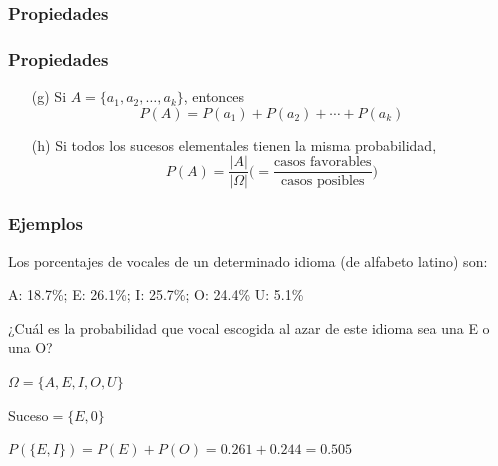 \documentclass[handout]{beamer}\usepackage[]{graphicx}\usepackage[]{color}
\theoremstyle{plain}
\theoremstyle{definition}
\begin{document}
\begin{frame}
\frametitle{Propiedades}
\begin{enumerate}[(a)]
\end{enumerate}
\end{frame}
\begin{frame}
\frametitle{Propiedades}
\begin{enumerate}[(a)]
\item[(g)] Si $A=\{a_1,a_2,\ldots,a_k\}$, entonces
$$
P(A)=P(a_1)+P(a_2)+\cdots+P(a_k)
$$

\item[(h)] Si todos los sucesos elementales tienen la misma probabilidad,
$$
P(A)=\frac{|A|}{|\Omega|}\Big(=\frac{\mbox{casos favorables}}{\mbox{casos posibles}}\Big)
$$
\end{enumerate}
\end{frame}


\begin{frame}
\frametitle{Ejemplos}

Los porcentajes de vocales de un determinado idioma (de alfabeto latino) son:

\begin{center}
A: 18.7\%; E: 26.1\%; I: 25.7\%; O: 24.4\% U: 5.1\%
\end{center}

¿Cuál es la probabilidad que vocal escogida al azar de este idioma sea una E o una O?
\medskip

$\Omega=\{A,E,I,O,U\}$
\medskip

Suceso$=\{E,0\}$
\bigskip

$P(\{E,I\})=P(E)+P(O)=0.261+0.244=0.505$


\end{frame}
\end{document}
